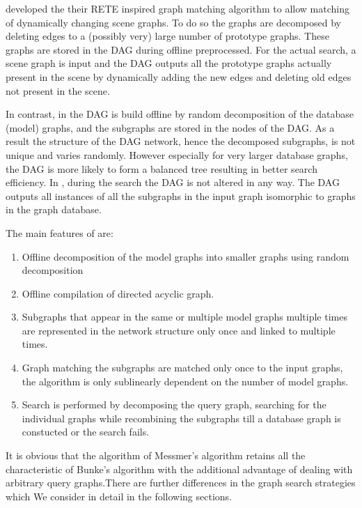 \cite{bunke_glauser_tran1991} developed the their RETE inspired graph matching algorithm to allow matching of dynamically changing scene graphs. To do so the graphs are decomposed by deleting edges to a (possibly very) large number of prototype graphs. These graphs are stored in the DAG during offline preprocessed. For the actual search, a scene graph is input and the DAG outputs all the prototype graphs actually present in the scene by dynamically  adding the new edges and deleting old edges not present in the scene.

In contrast, in \cite{messmer_bunke2000} the DAG is build offline by  random decomposition of the database (model) graphs, and the subgraphs are stored in the nodes of the DAG. As a result the structure of the DAG network, hence the decomposed subgraphs, is not unique and varies randomly. However especially for very larger database graphs, the DAG is more likely to form a balanced tree resulting in better search efficiency. In \cite{bunke_glauser_tran1991}, during the search the DAG is not altered in any way. The DAG outputs all instances of all the subgraphs in the input graph isomorphic to graphs in the graph database.  

The main features of \cite{bunke_glauser_tran1991} are:

\begin{enumerate}
\item Offline decomposition of the model graphs into smaller graphs using random decomposition
\item Offline compilation of directed acyclic graph.
\item Subgraphs that appear in the same or multiple model graphs multiple times are represented in the network structure only once and linked to multiple times.
\item Graph matching the subgraphs are matched only once to the input graphs, the algorithm is only sublinearly dependent on the number of model graphs.
\item Search is performed by decomposing the query graph, searching for the individual graphs while recombining the subgraphs till a database graph is constucted  or the search fails.
\end{enumerate}


It is obvious that the algorithm of Messmer's algorithm retains all the characteristic of Bunke's algorithm  with the additional advantage of dealing with arbitrary 
query graphs.There are further differences in the graph search strategies which We consider in detail in the following sections.


